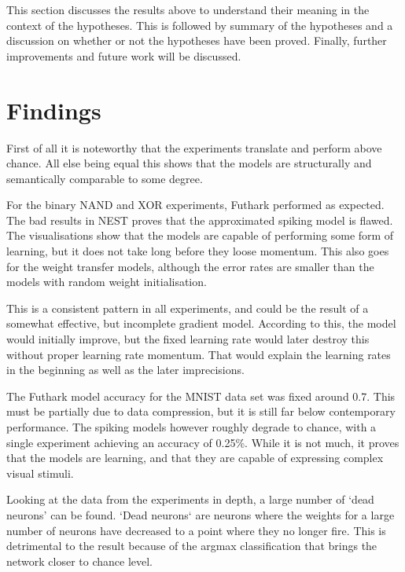 \documentclass[report.tex]{subfiles}
\begin{document}
This section discusses the results above to understand their meaning in the
context of the hypotheses.
This is followed by summary of the hypotheses and a discussion on whether or not
the hypotheses have been proved.
Finally, further improvements and future work will be discussed.

\section{Findings}
First of all it is noteworthy that the experiments translate and perform above
chance. 
All else being equal this shows that the models are structurally and
semantically comparable to some degree.

For the binary NAND and XOR experiments, Futhark performed as expected.
The bad results in NEST proves that the approximated spiking model is flawed.
The visualisations show that the models are capable of performing some form of
learning, but it does not take long before they loose momentum. 
This also goes for the weight transfer models, although the error rates are
smaller than the models with random weight initialisation.

This is a consistent pattern in all experiments, and could be the 
result of a somewhat effective, but incomplete gradient model.
According to this, the model would initially improve, but 
the fixed learning rate would later destroy this without proper learning
rate momentum.
That would explain the learning rates in the beginning as well as the later
imprecisions.

The Futhark model accuracy for the MNIST data set was fixed around 0.7.
This must be partially due to data compression, but it is still far below 
contemporary performance.
The spiking models however roughly degrade to chance, with a single experiment
achieving an accuracy of 0.25\%.
While it is not much, it proves that the models are learning, and that they are
capable of expressing complex visual stimuli.


Looking at the data from the experiments in depth, a large number of 
`dead neurons' can be found.
`Dead neurons` are neurons where the weights for a large number of
neurons have decreased to a point where they no longer fire.
This is detrimental to the result because of the argmax classification that
brings the network closer to chance level.
\\[0.1cm]
\end{document}
